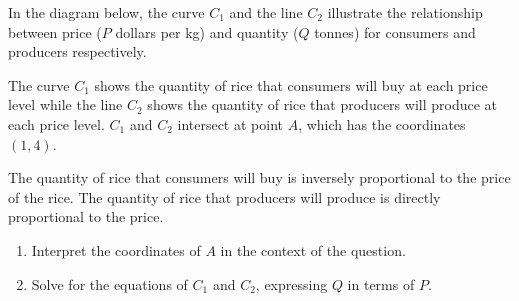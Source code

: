 \begin{problem}
    In the diagram below, the curve $C_1$ and the line $C_2$ illustrate the relationship between price ($P$ dollars per kg) and quantity ($Q$ tonnes) for consumers and producers respectively. 

    The curve $C_1$ shows the quantity of rice that consumers will buy at each price level while the line $C_2$ shows the quantity of rice that producers will produce at each price level. $C_1$ and $C_2$ intersect at point $A$, which has the coordinates $(1, 4)$.

    The quantity of rice that consumers will buy is inversely proportional to the price of the rice. The quantity of rice that producers will produce is directly proportional to the price.

    \begin{center}
    \end{center}

    \begin{enumerate}
        \item Interpret the coordinates of $A$ in the context of the question.
        \item Solve for the equations of $C_1$ and $C_2$, expressing $Q$ in terms of $P$.
    \end{enumerate}


\end{problem}
